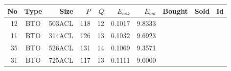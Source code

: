 \begin{tabular}{|r|c|r|r|r|r|r|p{2cm}|p{2cm}|r|}
\hline

No & Type & Size & $P$ & $Q$ & $E_{ask}$ & $E_{bid}$ & Bought & Sold & Id \\
\hline
12 & BTO & 503ACL & 118 & 12 & 0.1017 & 9.8333 &    &    &    \\
\hline
11 & BTO & 314ACL & 126 & 13 & 0.1032 & 9.6923 &    &    &    \\
\hline
35 & BTO & 526ACL & 131 & 14 & 0.1069 & 9.3571 &    &    &    \\
\hline
31 & BTO & 725ACL & 117 & 13 & 0.1111 & 9.0000 &    &    &    \\
\hline
\end{tabular}
